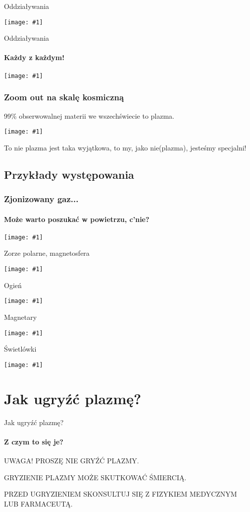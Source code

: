 \documentclass{beamer}
\newcommand {\framedgraphic}[1] {
        \begin{center}
            \texttt{[image: \#1]}
        \end{center}
}
\begin{document}
  \begin{frame}[t]{Oddziaływania}
    \framedgraphic{img/plasma_ionise_novectors.png}
  \end{frame}

  \begin{frame}[t]{Oddziaływania}
    \framesubtitle{Każdy z każdym!}
    \framedgraphic{img/plasma_ionise_vectors.png}
  \end{frame}



  \begin{frame}
    \frametitle{Zoom out na skalę kosmiczną}
    99\% obserwowalnej materii we wszechświecie to plazma.
    \pause
    \framedgraphic{img/starrynight}
    \pause
    To nie plazma jest taka wyjątkowa, to my, jako nie(plazma), jesteśmy specjalni!
  \end{frame}

\subsection{Przykłady występowania}

\begin{frame}
  \frametitle{Zjonizowany gaz...}
  \framesubtitle{Może warto poszukać w powietrzu, c'nie?}
  \framedgraphic{img/lightning.png}
\end{frame}

\begin{frame}[t]{Zorze polarne, magnetosfera}
  \framedgraphic{img/AuroraNorway.jpg}
\end{frame}

\begin{frame}[t]{Ogień}
  \framedgraphic{img/campfire.png}
\end{frame}

\begin{frame}[t]{Magnetary}
  \framedgraphic{img/Westerlund_magnetar.jpg}
\end{frame}

\begin{frame}[t]{Świetlówki}
  \framedgraphic{img/fluorescent}
\end{frame}

\section{Jak ugryźć plazmę?}
\begin{frame}[t]{Jak ugryźć plazmę?}
  \framesubtitle{Z czym to się je?}
  \pause
    \begin{alertblock}{UWAGA!}
    PROSZĘ NIE GRYŹĆ PLAZMY.

    GRYZIENIE PLAZMY MOŻE SKUTKOWAĆ ŚMIERCIĄ.

    PRZED UGRYZIENIEM SKONSULTUJ SIĘ Z FIZYKIEM MEDYCZNYM LUB FARMACEUTĄ.
  \end{alertblock}
\end{frame}
\end{document}
